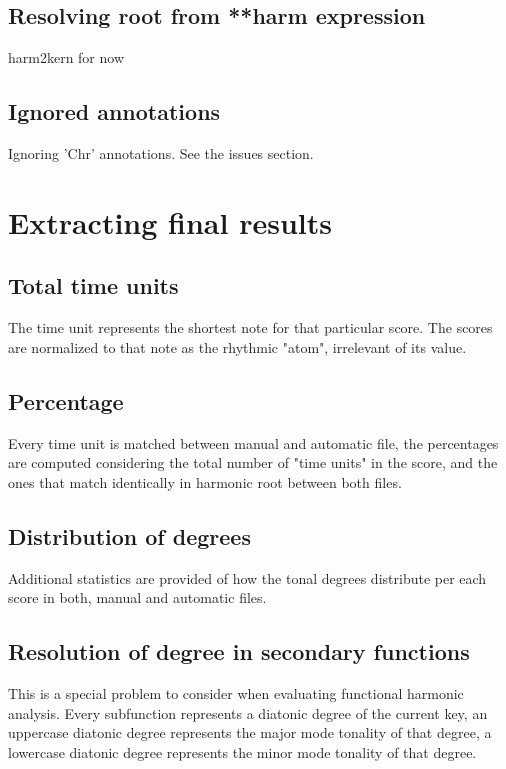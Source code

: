 	\subsection{Resolving root from **harm expression}
  harm2kern for now
	\subsection{Ignored annotations}
  Ignoring 'Chr' annotations. See the issues section.
\section{Extracting final results}
	\subsection{Total time units}
  The time unit represents the shortest note for that particular score. The scores are normalized to that note as the rhythmic "atom", irrelevant of its value.
	\subsection{Percentage}
  Every time unit is matched between manual and automatic file, the percentages are computed considering the total number of "time units" in the score, and the ones that match identically in harmonic root between both files.
	\subsection{Distribution of degrees}
  Additional statistics are provided of how the tonal degrees distribute per each score in both, manual and automatic files.
	\subsection{Resolution of degree in secondary functions}
  This is a special problem to consider when evaluating functional harmonic analysis. Every subfunction represents a diatonic degree of the current key, an uppercase diatonic degree represents the major mode tonality of that degree, a lowercase diatonic degree represents the minor mode tonality of that degree.

\newpage
